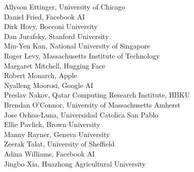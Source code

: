 \hspace*{0.2in} Allyson Ettinger, University of Chicago\\
\hspace*{0.2in} Daniel Fried, Facebook AI\\
\hspace*{0.2in} Dirk Hovy, Bocconi University\\
\hspace*{0.2in} Dan Jurafsky, Stanford University\\
\hspace*{0.2in} Min-Yen Kan, National University of Singapore\\
\hspace*{0.2in} Roger Levy, Massachusetts Institute of Technology\\
\hspace*{0.2in} Margaret Mitchell, Hugging Face\\
\hspace*{0.2in} Robert Monarch, Apple\\
\hspace*{0.2in} Nyalleng Moorosi, Google AI\\
\hspace*{0.2in} Preslav Nakov, Qatar Computing Research Institute, HBKU\\
\hspace*{0.2in} Brendan O'Connor, University of Massachusetts Amherst\\
\hspace*{0.2in} Jose Ochoa-Luna, Universidad Catolica San Pablo\\
\hspace*{0.2in} Ellie Pavlick, Brown University\\
\hspace*{0.2in} Manny Rayner, Geneva University\\
\hspace*{0.2in} Zeerak Talat, University of Sheffield\\
\hspace*{0.2in} Adina Williams, Facebook AI\\
\hspace*{0.2in} Jingbo Xia, Huazhong Agricultural University\\
